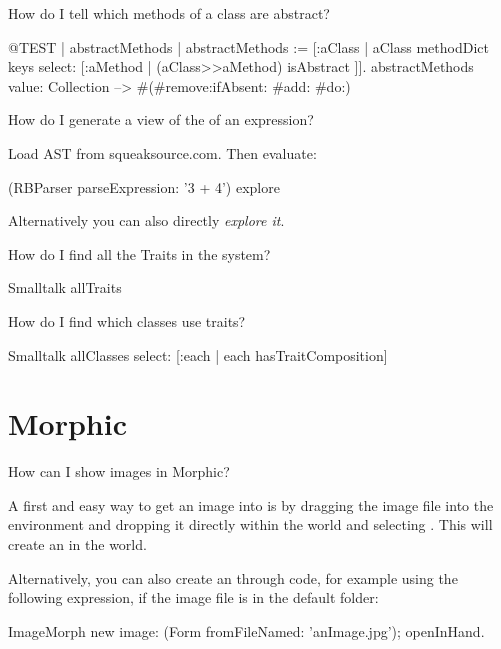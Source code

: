 \documentclass[a4paper,10pt,twoside]{book}
\begin{document}
\begin{faq}
How do I tell which methods of a class are abstract?
\end{faq}
\answer
\begin{code}{@TEST | abstractMethods |}
abstractMethods :=
	[:aClass | aClass methodDict keys select:
		[:aMethod | (aClass>>aMethod) isAbstract ]].
abstractMethods value: Collection --> #(#remove:ifAbsent: #add: #do:)
\end{code}

\begin{faq}
How do I generate a view of the  of an expression?
\end{faq}
\answer
Load AST from squeaksource.com. Then evaluate:
\begin{code}{}
(RBParser parseExpression: '3 + 4') explore
\end{code}
Alternatively you can also directly \emph{explore it}.

\begin{faq}
How do I find all the Traits in the system?
\end{faq}
\answer
\begin{code}{}
Smalltalk allTraits
\end{code}

\begin{faq}
How do I find which classes use traits?
\end{faq}
\answer
\begin{code}{}
Smalltalk allClasses select: [:each | each hasTraitComposition]
\end{code}

\section{Morphic}
\begin{faq}
How can I show images in Morphic?
\end{faq}
\answer
A first and easy way to get an image into \sq is by dragging the image file into the environment and dropping it directly within the world and selecting .
This will create an  in the world.

\noindent Alternatively, you can also create an  through code, for example using the following expression, if the image file is in the default folder:
\begin{code}{}
ImageMorph new
    image: (Form fromFileNamed: 'anImage.jpg');
    openInHand.
\end{code}
\end{document}
